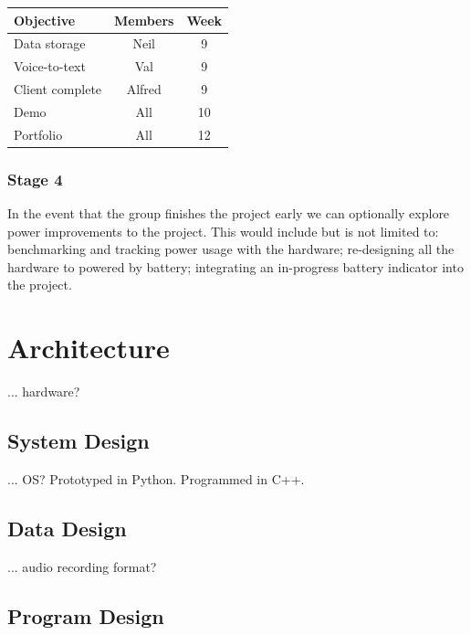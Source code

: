 \documentclass[11pt,a4paper,titlepage]{report}
\begin{document}
\begin{center}
\begin{table}[H]
\begin{tabular}{|l|c|c|}
    \hline
    \textbf{Objective} & \textbf{Members} & \textbf{Week} \\ \hline

    Data storage & Neil & 9 \\ \hline    
    Voice-to-text & Val & 9 \\ \hline    
    Client complete & Alfred & 9 \\ \hline    
    Demo & All & 10 \\ \hline    
    Portfolio & All & 12 \\ \hline    

\end{tabular}
\end{table}
\end{center}

\subsubsection{Stage 4}

In the event that the group finishes the project early we can optionally explore power improvements to the project. This would include but is not limited to: benchmarking and tracking power usage with the hardware; re-designing all the hardware to powered by battery; integrating an in-progress battery indicator into the project.



\section{Architecture}

... hardware?

\subsection{System Design}

... OS? Prototyped in Python. Programmed in C++.

\subsection{Data Design}

... audio recording format?

\subsection{Program Design}
\end{document}
